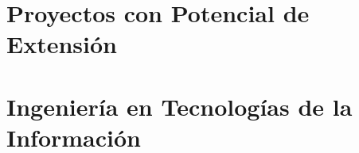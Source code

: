 \documentclass[aspectratio=169,compress]{beamer}
\begin{document}


%











\section[PPE]{Proyectos con Potencial de Extensión}



%  
      
%
   




\section{Ingeniería en Tecnologías de la Información}

%
%
%
%
%







\end{document}
